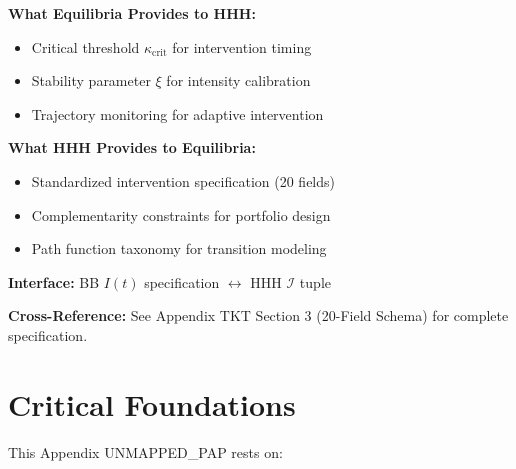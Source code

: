 \documentclass[11pt, a4paper]{article}
\begin{document}
\begin{tcolorbox}[colback=orange!5!white, colframe=orange!75!black,
    title=\textbf{Integration: Equilibria $\leftrightarrow$ HHH (Intervention Toolkit)}]
\textbf{What Equilibria Provides to HHH:}
\begin{itemize}[nosep]
\item Critical threshold $\kappa_{\text{crit}}$ for intervention timing
\item Stability parameter $\xi$ for intensity calibration
\item Trajectory monitoring for adaptive intervention
\end{itemize}

\textbf{What HHH Provides to Equilibria:}
\begin{itemize}[nosep]
\item Standardized intervention specification (20 fields)
\item Complementarity constraints for portfolio design
\item Path function taxonomy for transition modeling
\end{itemize}

\textbf{Interface:} BB $I(t)$ specification $\leftrightarrow$ HHH $\mathcal{I}$ tuple

\textbf{Cross-Reference:} See Appendix TKT Section 3 (20-Field Schema) for complete specification.

\end{tcolorbox}


\section{Critical Foundations}

This Appendix UNMAPPED_PAP rests on:
\end{document}
